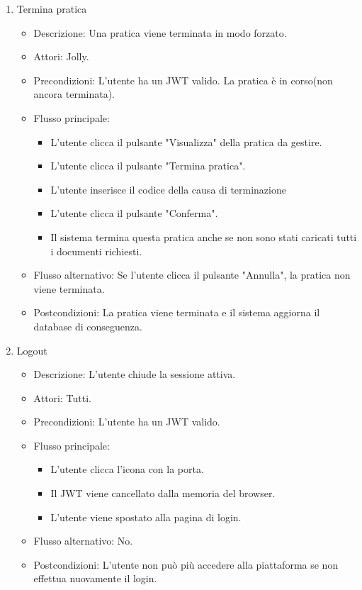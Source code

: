 \documentclass{article}
\begin{document}
\begin{enumerate}
    \item Termina pratica 
    \begin{itemize}
        \item Descrizione: Una pratica viene terminata in modo forzato.
        \item Attori: Jolly.
        \item Precondizioni: L'utente ha un JWT valido. La pratica è in corso(non ancora terminata).
        \item Flusso principale: \begin{itemize}
            \item L'utente clicca il pulsante "Visualizza" della pratica da gestire.
            \item L'utente clicca il pulsante "Termina pratica".
            \item L'utente inserisce il codice della causa di terminazione
            \item L'utente clicca il pulsante "Conferma".
            \item Il sistema termina questa pratica anche se non sono stati caricati tutti i documenti richiesti.
        \end{itemize}
        \item Flusso alternativo: Se l'utente clicca il pulsante "Annulla", la pratica non viene terminata.
        \item Postcondizioni: La pratica viene terminata e il sistema aggiorna il database di conseguenza.
    \end{itemize}
    \item Logout
    \begin{itemize}
        \item Descrizione: L'utente chiude la sessione attiva.
        \item Attori: Tutti.
        \item Precondizioni: L'utente ha un JWT valido.
        \item Flusso principale: \begin{itemize}
            \item L'utente clicca l'icona con la porta.
            \item Il JWT viene cancellato dalla memoria del browser.
            \item L'utente viene spostato alla pagina di login.
        \end{itemize}
        \item Flusso alternativo: No.
        \item Postcondizioni: L'utente non può più accedere alla piattaforma se non effettua nuovamente il login.
    \end{itemize}
\end{enumerate}
\end{document}
